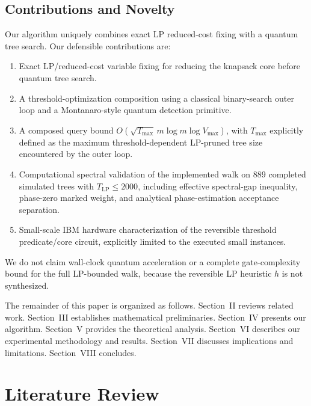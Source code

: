 \documentclass[conference]{IEEEtran} \IEEEoverridecommandlockouts
\begin{document}
\subsection{Contributions and Novelty}

Our algorithm uniquely combines exact LP reduced-cost fixing with a quantum tree search. Our defensible contributions are:

\begin{enumerate}
    \item Exact LP/reduced-cost variable fixing for reducing the knapsack core before quantum tree search.
    \item A threshold-optimization composition using a classical binary-search outer loop and a Montanaro-style quantum detection primitive.
    \item A composed query bound $O\!\left(\sqrt{T_{\max}}\,m\log m\log V_{\max}\right)$, with $T_{\max}$ explicitly defined as the maximum threshold-dependent LP-pruned tree size encountered by the outer loop.
    \item Computational spectral validation of the implemented walk on 889 completed simulated trees with $T_{\text{LP}} \le 2000$, including effective spectral-gap inequality, phase-zero marked weight, and analytical phase-estimation acceptance separation.
    \item Small-scale IBM hardware characterization of the reversible threshold predicate/core circuit, explicitly limited to the executed small instances.
\end{enumerate}

We do not claim wall-clock quantum acceleration or a complete gate-complexity bound for the full LP-bounded walk, because the reversible LP heuristic $h$ is not synthesized.

The remainder of this paper is organized as follows. Section~II reviews related work. Section~III establishes mathematical preliminaries. Section~IV presents our algorithm. Section~V provides the theoretical analysis. Section~VI describes our experimental methodology and results. Section~VII discusses implications and limitations. Section~VIII concludes.

\section{Literature Review}
\end{document}
